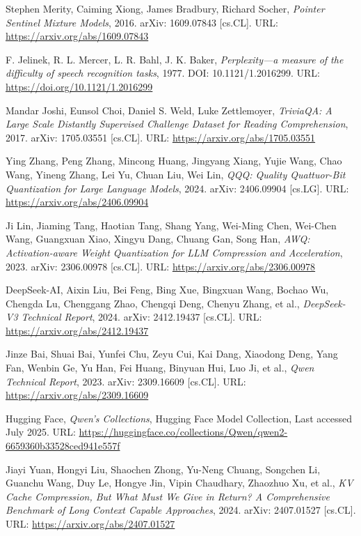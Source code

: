 \begin{thebibliography}{9}
	Stephen Merity, Caiming Xiong, James Bradbury, Richard Socher,
	\textit{Pointer Sentinel Mixture Models},
	2016. arXiv: 1609.07843 [cs.CL]. URL: \url{https://arxiv.org/abs/1609.07843}

	F. Jelinek, R. L. Mercer, L. R. Bahl, J. K. Baker,
	\textit{Perplexity—a measure of the difficulty of speech recognition tasks},
	1977. DOI: 10.1121/1.2016299. URL: \url{https://doi.org/10.1121/1.2016299}

	Mandar Joshi, Eunsol Choi, Daniel S. Weld, Luke Zettlemoyer,
	\textit{TriviaQA: A Large Scale Distantly Supervised Challenge Dataset for Reading Comprehension},
	2017. arXiv: 1705.03551 [cs.CL]. URL: \url{https://arxiv.org/abs/1705.03551}

	Ying Zhang, Peng Zhang, Mincong Huang, Jingyang Xiang, Yujie Wang, Chao Wang, Yineng Zhang, Lei Yu, Chuan Liu, Wei Lin,
	\textit{QQQ: Quality Quattuor-Bit Quantization for Large Language Models},
	2024. arXiv: 2406.09904 [cs.LG]. URL: \url{https://arxiv.org/abs/2406.09904}

	Ji Lin, Jiaming Tang, Haotian Tang, Shang Yang, Wei-Ming Chen, Wei-Chen Wang, Guangxuan Xiao, Xingyu Dang, Chuang Gan, Song Han,
	\textit{AWQ: Activation-aware Weight Quantization for LLM Compression and Acceleration},
	2023. arXiv: 2306.00978 [cs.CL]. URL: \url{https://arxiv.org/abs/2306.00978}

	DeepSeek-AI, Aixin Liu, Bei Feng, Bing Xue, Bingxuan Wang, Bochao Wu, Chengda Lu, Chenggang Zhao, Chengqi Deng, Chenyu Zhang, et al.,
	\textit{DeepSeek-V3 Technical Report},
	2024. arXiv: 2412.19437 [cs.CL]. URL: \url{https://arxiv.org/abs/2412.19437}

	Jinze Bai, Shuai Bai, Yunfei Chu, Zeyu Cui, Kai Dang, Xiaodong Deng, Yang Fan, Wenbin Ge, Yu Han, Fei Huang, Binyuan Hui, Luo Ji, et al.,
	\textit{Qwen Technical Report},
	2023. arXiv: 2309.16609 [cs.CL]. URL: \url{https://arxiv.org/abs/2309.16609}

	Hugging Face,
	\textit{Qwen's Collections},
	Hugging Face Model Collection, Last accessed July 2025. URL: \url{https://huggingface.co/collections/Qwen/qwen2-6659360b33528ced941e557f}

	Jiayi Yuan, Hongyi Liu, Shaochen Zhong, Yu-Neng Chuang, Songchen Li, Guanchu Wang, Duy Le, Hongye Jin, Vipin Chaudhary, Zhaozhuo Xu, et al.,
	\textit{KV Cache Compression, But What Must We Give in Return? A Comprehensive Benchmark of Long Context Capable Approaches},
	2024. arXiv: 2407.01527 [cs.CL]. URL: \url{https://arxiv.org/abs/2407.01527}


\end{thebibliography}
